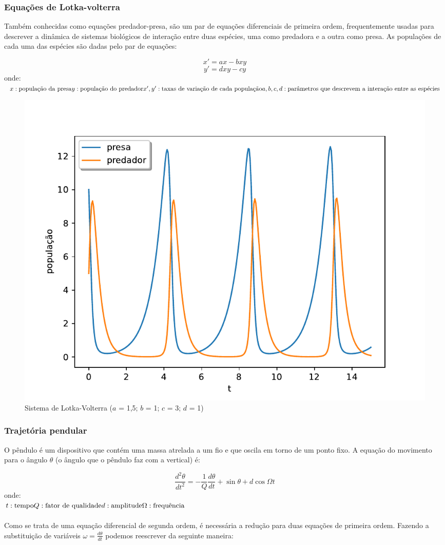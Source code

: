 \subsubsection{Equações de Lotka-volterra}
Também conhecidas como equações predador-presa, são um par de equações diferenciais de primeira ordem, frequentemente usadas para descrever a dinâmica de sistemas biológicos de interação entre duas espécies, uma como predadora e a outra como presa. As populações de cada uma das espécies são dadas pelo par de equações:

$$
x' = ax - bxy
$$$$
y' = dxy - cy
$$
onde:\\
$
x: \text{população da presa}\\
y: \text{população do predador}\\
x', y': \text{taxas de variação de cada população}\\
a, b, c, d: \text{parâmetros que descrevem a interação entre as espécies}
$

\begin{figure}[htb!]
	\centering
	\caption{Sistema de Lotka-Volterra ($a$ = 1,5; $b$ = 1; $c$ = 3; $d$ = 1)}
	\label{fig:lotka-volterra}
	\includegraphics[width=0.7\linewidth]{figs/lotka-volterra}
\end{figure}


\subsubsection{Trajetória pendular}
O pêndulo é um dispositivo que contém uma massa atrelada a um fio e que oscila em torno de um ponto fixo. A equação do movimento para o ângulo $\theta$ (o ângulo que o pêndulo faz com a vertical) é:

$$
\frac{d^2\theta}{dt^2} = -\frac{1}{Q}\frac{d\theta}{dt} + \sin{\theta} + d\cos{\Omega t}
$$
onde:\\
$
t: \text{tempo}\\
Q: \text{fator de qualidade}\\
d: \text{amplitude}\\
\Omega: \text{frequência}
$
\\\\
Como se trata de uma equação diferencial de segunda ordem, é necessária a redução para duas equações de primeira ordem. Fazendo a substituição de variáveis $\omega = \frac{d\theta}{dt}$ podemos reescrever da seguinte maneira:

